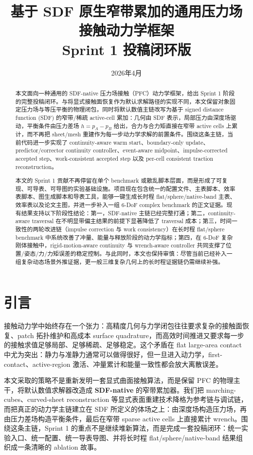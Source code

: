 \documentclass[11pt,a4paper]{ctexart}
\title{基于 SDF 原生窄带累加的通用压力场接触动力学框架\\Sprint 1 投稿闭环版}
\author{}
\date{2026年4月}
\begin{document}
\maketitle

\begin{abstract}
本文面向一种通用的 SDF-native 压力场接触（PFC）动力学框架，给出 Sprint 1 阶段的完整投稿闭环。与将显式接触面恢复作为默认求解路径的实现不同，本文保留对象固定压力场与等压平衡的物理闭包，同时将默认数值主链改写为基于 signed distance function (SDF) 的窄带/稀疏 active-cell 累加：几何由 SDF 表示，局部压力由深度场驱动，平衡条件由压力差场 $h=p_A-p_B$ 给出，合力与合力矩直接在窄带 active cells 上累计，而不再把 sheet/mesh 重建作为每一步动力学求解的前置条件。围绕这条主链，当前代码进一步实现了 continuity-aware warm start、boundary-only update、predictor/corrector continuity controller、event-aware midpoint、impulse-corrected accepted step、work-consistent accepted step 以及 per-cell consistent traction reconstruction。

本文的 Sprint 1 贡献不再停留在单个 benchmark 或散乱脚本层面，而是形成了可复现、可导表、可导图的实验基础设施。项目现在包含统一的配置文件、主表脚本、效率表脚本、图生成脚本和导表工具，能够一键生成长时程 flat/sphere/native-band 主表、效率表以及论文主图，并进一步补入一组 6-DoF complex benchmark 的正文证据。现有结果支持以下阶段性结论：第一，SDF-native 主链已经完整打通；第二，continuity-aware traversal 在不明显带偏主结果的前提下显著降低了 traversal 成本；第三，时间一致性的两轮改进链（impulse correction 与 work consistency）在长时程 flat/sphere benchmark 中系统改善了冲量、能量与释放阶段的动力学指标；第四，在 6-DoF 复杂刚体接触中，rigid-motion-aware continuity 与 wrench-aware controller 共同支撑了位置/姿态/力/力矩误差的稳定控制。与此同时，本文也保持审慎：尽管当前已经补入一组复杂动态场景外推证据，更一般三维复杂几何上的长时程证据链仍需继续补强。
\end{abstract}

\tableofcontents

\section{引言}
接触动力学中始终存在一个张力：高精度几何与力学闭包往往要求复杂的接触面恢复、patch 拓扑维护和高成本 surface quadrature，而高效时间推进又要求每一步的接触求值足够局部、足够稀疏、足够稳定。这个矛盾在 flat large-area contact 中尤为突出：静力与准静力通常可以做得很好，但一旦进入动力学，first-contact、active-region 激活、冲量累计和能量一致性都会放大离散误差。

本文采取的策略不是重新发明一套显式曲面接触算法，而是保留 PFC 的物理主干，将默认数值求解器改造成 \textbf{SDF-native} 的窄带累加器。我们把 marching-cubes、curved-sheet reconstruction 等显式表面重建技术降格为参考链与调试链，而把真正的动力学主链建立在 SDF 所定义的体场之上：由深度场构造压力场，再由压力差场构造平衡条件，最后在窄带 sparse active cells 上直接累计 wrench。围绕这条主链，Sprint 1 的重点不是继续堆新算法，而是完成一套投稿闭环：统一实验入口、统一配置、统一导表导图、并将长时程 flat/sphere/native-band 结果组织成一条清晰的 ablation 故事。
\end{document}
